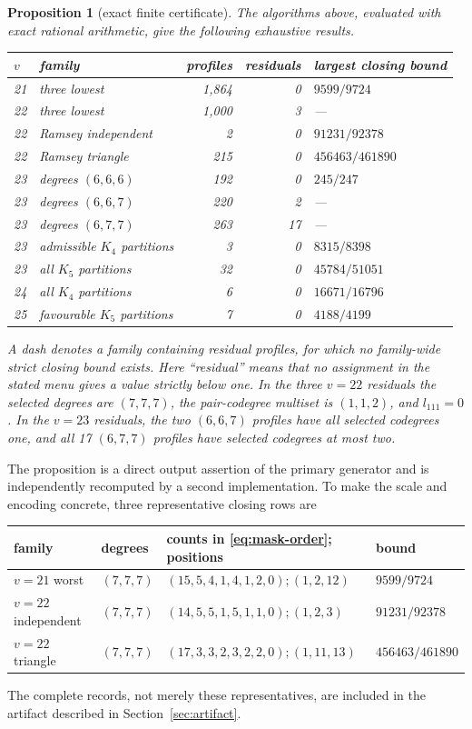 \documentclass[11pt]{article}
\newtheorem{proposition}[theorem]{Proposition}
\theoremstyle{remark}
\begin{document}
\begin{proposition}[exact finite certificate]\label{prop:finite}
The algorithms above, evaluated with exact rational arithmetic, give the
following exhaustive results.
\begin{center}
\begin{tabular}{@{}llrrl@{}}
\toprule
$v$ & family & profiles & residuals & largest closing bound\\
\midrule
21 & three lowest & 1,864 & 0 & $9599/9724$\\
22 & three lowest & 1,000 & 3 & ---\\
22 & Ramsey independent & 2 & 0 & $91231/92378$\\
22 & Ramsey triangle & 215 & 0 & $456463/461890$\\
23 & degrees $(6,6,6)$ & 192 & 0 & $245/247$\\
23 & degrees $(6,6,7)$ & 220 & 2 & ---\\
23 & degrees $(6,7,7)$ & 263 & 17 & ---\\
23 & admissible $K_4$ partitions & 3 & 0 & $8315/8398$\\
23 & all $K_5$ partitions & 32 & 0 & $45784/51051$\\
24 & all $K_4$ partitions & 6 & 0 & $16671/16796$\\
25 & favourable $K_5$ partitions & 7 & 0 & $4188/4199$\\
\bottomrule
\end{tabular}
\end{center}
A dash denotes a family containing residual profiles, for which no
family-wide strict closing bound exists.
Here ``residual'' means that no assignment in the stated menu gives a value
strictly below one.  In the three $v=22$ residuals the selected degrees are
$(7,7,7)$, the pair-codegree multiset is $(1,1,2)$, and $l_{111}=0$.  In the
$v=23$ residuals, the two $(6,6,7)$ profiles have all selected codegrees one,
and all 17 $(6,7,7)$ profiles have selected codegrees at most two.
\end{proposition}

The proposition is a direct output assertion of the primary generator and
is independently recomputed by a second implementation.  To make the scale
and encoding concrete, three representative closing rows are
\begin{center}
\begin{tabular}{@{}llll@{}}
\toprule
family & degrees & counts in \eqref{eq:mask-order}; positions & bound\\
\midrule
$v=21$ worst & $(7,7,7)$ &
$(15,5,4,1,4,1,2,0);(1,2,12)$ & $9599/9724$\\
$v=22$ independent & $(7,7,7)$ &
$(14,5,5,1,5,1,1,0);(1,2,3)$ & $91231/92378$\\
$v=22$ triangle & $(7,7,7)$ &
$(17,3,3,2,3,2,2,0);(1,11,13)$ & $456463/461890$\\
\bottomrule
\end{tabular}
\end{center}
The complete records, not merely these representatives, are included in the
artifact described in Section~\ref{sec:artifact}.
\end{document}
